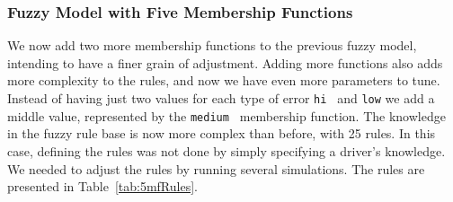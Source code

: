 \documentclass[symmetry,article,submit,moreauthors,pdftex]{Definitions/mdpi}
\begin{document}
\subsubsection{Fuzzy Model with Five Membership Functions}

We now add two more membership functions to the previous fuzzy model, intending
to have a finer grain of adjustment. Adding more functions also adds more
complexity to the rules, and now we have even more parameters to tune.  Instead
of having just two values for each type of error { \tt hi } and {\tt low} we
add a middle value, represented by the { \tt medium } membership function. The
knowledge in the fuzzy rule base is now more complex than before, with 25
rules. In this case, defining the rules was not done by simply specifying a
driver's knowledge. We needed to adjust the rules by running several
simulations. The rules are presented in Table~\ref{tab:5mfRules}.
\end{document}
